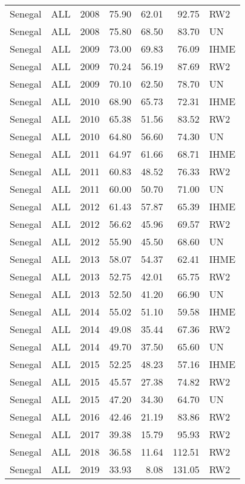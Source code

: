 \begin{longtable}{lllrrrl}
  Senegal & ALL & 2008 & 75.90 & 62.01 & 92.75 & RW2 \\ 
  Senegal & ALL & 2008 & 75.80 & 68.50 & 83.70 & UN \\ 
  Senegal & ALL & 2009 & 73.00 & 69.83 & 76.09 & IHME \\ 
  Senegal & ALL & 2009 & 70.24 & 56.19 & 87.69 & RW2 \\ 
  Senegal & ALL & 2009 & 70.10 & 62.50 & 78.70 & UN \\ 
  Senegal & ALL & 2010 & 68.90 & 65.73 & 72.31 & IHME \\ 
  Senegal & ALL & 2010 & 65.38 & 51.56 & 83.52 & RW2 \\ 
  Senegal & ALL & 2010 & 64.80 & 56.60 & 74.30 & UN \\ 
  Senegal & ALL & 2011 & 64.97 & 61.66 & 68.71 & IHME \\ 
  Senegal & ALL & 2011 & 60.83 & 48.52 & 76.33 & RW2 \\ 
  Senegal & ALL & 2011 & 60.00 & 50.70 & 71.00 & UN \\ 
  Senegal & ALL & 2012 & 61.43 & 57.87 & 65.39 & IHME \\ 
  Senegal & ALL & 2012 & 56.62 & 45.96 & 69.57 & RW2 \\ 
  Senegal & ALL & 2012 & 55.90 & 45.50 & 68.60 & UN \\ 
  Senegal & ALL & 2013 & 58.07 & 54.37 & 62.41 & IHME \\ 
  Senegal & ALL & 2013 & 52.75 & 42.01 & 65.75 & RW2 \\ 
  Senegal & ALL & 2013 & 52.50 & 41.20 & 66.90 & UN \\ 
  Senegal & ALL & 2014 & 55.02 & 51.10 & 59.58 & IHME \\ 
  Senegal & ALL & 2014 & 49.08 & 35.44 & 67.36 & RW2 \\ 
  Senegal & ALL & 2014 & 49.70 & 37.50 & 65.60 & UN \\ 
  Senegal & ALL & 2015 & 52.25 & 48.23 & 57.16 & IHME \\ 
  Senegal & ALL & 2015 & 45.57 & 27.38 & 74.82 & RW2 \\ 
  Senegal & ALL & 2015 & 47.20 & 34.30 & 64.70 & UN \\ 
  Senegal & ALL & 2016 & 42.46 & 21.19 & 83.86 & RW2 \\ 
  Senegal & ALL & 2017 & 39.38 & 15.79 & 95.93 & RW2 \\ 
  Senegal & ALL & 2018 & 36.58 & 11.64 & 112.51 & RW2 \\ 
  Senegal & ALL & 2019 & 33.93 & 8.08 & 131.05 & RW2 \\ 

\end{longtable}
